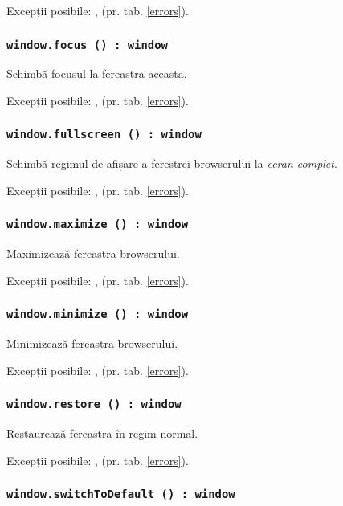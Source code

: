Excepții posibile: ,  (pr. tab. \ref{errors}).

\subsubsection{\texttt{window.focus () : window}}

Schimbă focusul la fereastra aceasta.

Excepții posibile: ,  (pr. tab. \ref{errors}).

\subsubsection{\texttt{window.fullscreen () : window}}

Schimbă regimul de afișare a ferestrei browserului la \textit{ecran complet}.

Excepții posibile: ,  (pr. tab. \ref{errors}).

\subsubsection{\texttt{window.maximize () : window}}

Maximizează fereastra browserului.

Excepții posibile: ,  (pr. tab. \ref{errors}).

\subsubsection{\texttt{window.minimize () : window}}

Minimizează fereastra browserului.

Excepții posibile: ,  (pr. tab. \ref{errors}).

\subsubsection{\texttt{window.restore () : window}}

Restaurează fereastra în regim normal.

Excepții posibile: ,  (pr. tab. \ref{errors}).

\subsubsection{\texttt{window.switchToDefault () : window}}

